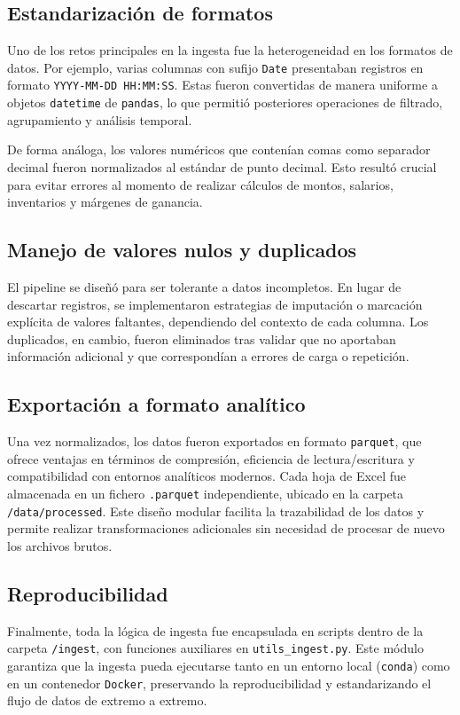 \documentclass[12pt,a4paper]{article}
\begin{document}
\subsection{Estandarización de formatos}
Uno de los retos principales en la ingesta fue la heterogeneidad en los formatos de datos. 
Por ejemplo, varias columnas con sufijo \texttt{Date} presentaban registros en formato 
\texttt{YYYY-MM-DD HH:MM:SS}. Estas fueron convertidas de manera uniforme a objetos 
\texttt{datetime} de \texttt{pandas}, lo que permitió posteriores operaciones de filtrado, 
agrupamiento y análisis temporal.

De forma análoga, los valores numéricos que contenían comas como separador decimal fueron 
normalizados al estándar de punto decimal. Esto resultó crucial para evitar errores al momento 
de realizar cálculos de montos, salarios, inventarios y márgenes de ganancia.

\subsection{Manejo de valores nulos y duplicados}
El pipeline se diseñó para ser tolerante a datos incompletos. En lugar de descartar registros, 
se implementaron estrategias de imputación o marcación explícita de valores faltantes, dependiendo 
del contexto de cada columna. Los duplicados, en cambio, fueron eliminados tras validar que no 
aportaban información adicional y que correspondían a errores de carga o repetición.

\subsection{Exportación a formato analítico}
Una vez normalizados, los datos fueron exportados en formato \texttt{parquet}, que ofrece ventajas 
en términos de compresión, eficiencia de lectura/escritura y compatibilidad con entornos analíticos 
modernos. Cada hoja de Excel fue almacenada en un fichero \texttt{.parquet} independiente, ubicado 
en la carpeta \texttt{/data/processed}. Este diseño modular facilita la trazabilidad de los datos 
y permite realizar transformaciones adicionales sin necesidad de procesar de nuevo los archivos brutos.

\subsection{Reproducibilidad}
Finalmente, toda la lógica de ingesta fue encapsulada en scripts dentro de la carpeta 
\texttt{/ingest}, con funciones auxiliares en \texttt{utils\_ingest.py}. Este módulo garantiza que 
la ingesta pueda ejecutarse tanto en un entorno local (\texttt{conda}) como en un contenedor 
\texttt{Docker}, preservando la reproducibilidad y estandarizando el flujo de datos de extremo a extremo.
\end{document}

